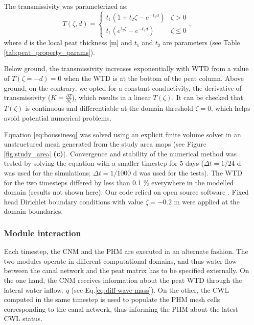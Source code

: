 \documentclass[bg, manuscript]{copernicus}
\begin{document}
The transmissivity was parameterized as:
\begin{equation} \label{eq:T_zeta}
T (\zeta, d) =
	\begin{cases}
         t_1 \left( 1 + t_2\zeta - e^{-t_2 d} \right) & \zeta > 0 \\
		 t_1(e^{t_2\zeta} - e^{-t_2 d}) & \zeta \leq 0
	\end{cases}
 ,
\end{equation}
where $d$ is the local peat thickness [\unit{m}] and $t_1$ and $t_2$ are parameters (see Table \ref{tab:peat_property_params}).

Below ground, the transmissivity increases exponentially with WTD from a value of $T(\zeta = -d)=0$ when the WTD is at the bottom of the peat column. 
Above ground, on the contrary, we opted for a constant conductivity, the derivative of transmissivity ($K = \frac{\partial T}{\partial \zeta}$), which results in a linear $T(\zeta)$.
It can be checked that $T(\zeta)$ is continuous and differentiable at the domain threshold $\zeta = 0$, which helps avoid potential numerical problems.

Equation \eqref{eq:boussinesq} was solved using an explicit finite volume solver in an unstructured mesh generated from the study area maps (see Figure \ref{fig:study_area} \textbf{(c)}).
Convergence and stability of the numerical method was tested by solving the equation with a smaller timestep for 5 days ($\Delta t= 1/24$ \unit{d} was used for the simulations; $\Delta t = 1/1000$ \unit{d} was used for the tests).
The WTD for the two timesteps differed by less than 0.1 \% everywhere in the modelled domain (results not shown here).
Our code relied on open source software \citep{guyerFiPyPartialDifferential2009, geuzaineGmshThreedimensionalFinite2009}.
Fixed head Dirichlet boundary conditions with value $\zeta = -0.2$ \unit{m} were applied at the domain boundaries.

\subsubsection{Module interaction}
Each timestep, the CNM and the PHM are executed in an alternate fashion.
The two modules operate in different computational domains, and thus water flow between the canal network and the peat matrix has to be specified externally.
On the one hand, the CNM receives information about the peat WTD through the lateral water inflow, $q$ (see Eq.\eqref{eq:diff-wave-mass}). 
On the other, the CWL computed in the same timestep is used to populate the PHM mesh cells corresponding to the canal network, thus informing the PHM about the latest CWL status.
\end{document}
